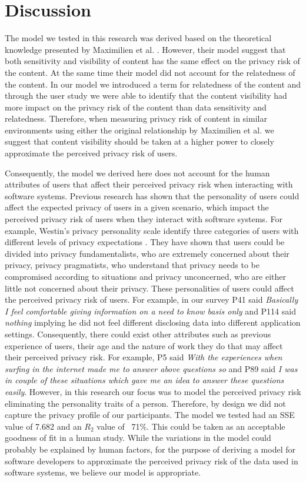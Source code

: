 \documentclass[10pt]{article}
\begin{document}
\section {Discussion}

The model we tested in this research was derived based on the theoretical knowledge presented by Maximilien et al. \cite {maximilien2009privacy}. However, their model suggest that both sensitivity and visibility of content has the same effect on the privacy risk of the content. At the same time their model did not account for the relatedness of the content. In our model we introduced a term for relatedness of the content and through the user study we were able to identify that the content visibility had more impact on the privacy risk of the content than data sensitivity and relatedness. Therefore, when measuring privacy risk of content in similar environments using either   the original relationship by Maximilien et al. \cite {maximilien2009privacy} we suggest that content visibility should be taken at a higher power to closely approximate the perceived privacy risk of users. 

Consequently, the model we derived here does not account for the human attributes of users that affect their perceived privacy risk when interacting with software systems. Previous research has shown that the personality of users could affect the expected privacy of users in a given scenario, which impact the perceived privacy risk of users when they interact with software systems. For example, Westin's privacy personality scale identify three categories of users with different levels of privacy expectations \cite {westin1991equifax}. They have shown that users could be divided into privacy fundamentalists, who are extremely concerned about their privacy, privacy pragmatists, who understand that privacy needs to be compromised according to situations and privacy unconcerned, who are either little not concerned about their privacy. These personalities of users could affect the perceived privacy risk of users. For example, in our survey P41 said \textit{Basically I feel comfortable giving information on a need to know basis only} and P114 said \textit {nothing} implying he did not feel different disclosing data into different application settings. Consequently, there could exist other attributes such as previous experience of users, their age and the nature of work they do that may affect their perceived privacy risk. For example, P5 said \textit{With the experiences when surfing in the internet made me to answer above questions so} and P89 said \textit {I was in couple of these situations which gave me an idea to answer these questions easily}. However, in this research our focus was to model the perceived privacy risk eliminating the personality traits of a person. Therefore, by design we did not capture the privacy profile of our participants. The model we tested had an SSE value of 7.682 and an $R_{2}$ value of ~71\%. This could be taken as an acceptable goodness of fit in a human study. While the variations in the model could probably be explained by human factors, for the purpose of deriving a model for software developers to approximate the perceived privacy risk of the data used in software systems, we believe our model is appropriate.
\end{document}
